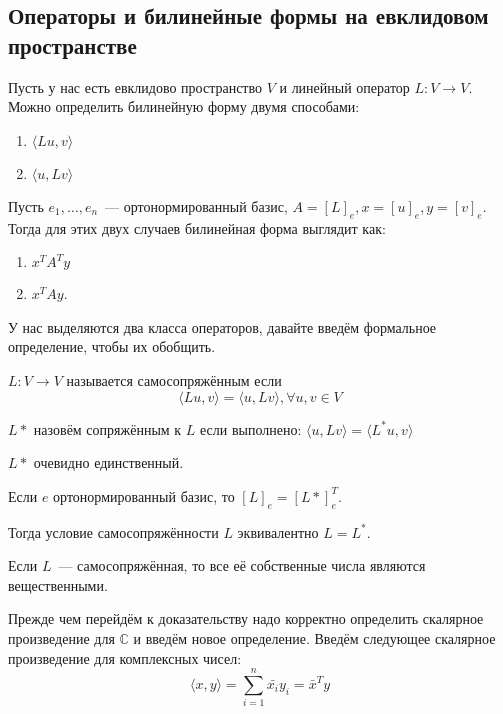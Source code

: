 \subsection{Операторы и билинейные формы на евклидовом пространстве}
Пусть у нас есть евклидово пространство $V$ и линейный оператор 
$L\colon V \to V$. Можно определить билинейную форму  двумя способами:
\begin{enumerate}
    \item $ \langle Lu, v \rangle$ 
    \item $\langle u, Lv \rangle$
\end{enumerate}
Пусть $e_1, \dots, e_n$~--- ортонормированный базис,
$A = [L]_e, x = [u]_e, y = [v]_e$.
Тогда для этих двух случаев билинейная форма выглядит как:
\begin{enumerate}
    \item $x^T A^T y$ 
    \item $x^T A y$.
\end{enumerate}
У нас выделяются два класса операторов, давайте введём формальное определение,
чтобы их обобщить.
\begin{definition}
    $L: V \to V$ называется самосопряжённым если 
    \[
        \langle Lu, v \rangle = \langle u, Lv \rangle, \forall u, v\in V
    \]
\end{definition}
\begin{definition}
    $L*$ назовём сопряжённым к $L$ если выполнено:
    $\langle u, Lv \rangle = \langle L^* u, v \rangle$
\end{definition}
\begin{remark}
    $L*$ очевидно единственный.
\end{remark}
\begin{remark}
    Если $e$ ортонормированный базис, то $[L]_e = [L*]_e^T$.
\end{remark}
\begin{follow}
    Тогда условие самосопряжённости $L$ эквивалентно $L = L^*$.
\end{follow}

\begin{statement}
    Если $L$~--- самосопряжённая, то все её собственные числа являются
    вещественными.
\end{statement}
Прежде чем перейдём к доказательству надо корректно определить 
скалярное произведение для $\mathbb{C}$ и введём новое определение.
Введём следующее скалярное произведение для комплексных чисел:
\[
    \langle x, y \rangle = \sum\limits_{i=1}^{n}{\bar{x_i}y_i} = \bar{x}^T y
\]

